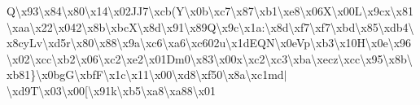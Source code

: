 Q\textbackslash{}x93\textbackslash{}x84\textbackslash{}x80\textbackslash{}x14\textbackslash{}x02\+J\+J7\textbackslash{}xcb(\+Y\textbackslash{}x0b\textquotesingle{}\textbackslash{}xc7\textbackslash{}x87\textbackslash{}xb1\textbackslash{}xe8\textbackslash{}x06\+X\textbackslash{}x00\+L\textbackslash{}x9cx\textbackslash{}x81\textbackslash{}xaa\textbackslash{}x22\textbackslash{}x042\textbackslash{}x8b\textbackslash{}xbc\+X\textbackslash{}x8d\textbackslash{}x91\textbackslash{}x89\+Q\textbackslash{}x9c\textbackslash{}x1a\+:\textbackslash{}x8d\textbackslash{}xf7\textbackslash{}xf7\textbackslash{}xbd\textbackslash{}x85\textbackslash{}xdb4\textbackslash{}x8cy\+Lv\textbackslash{}xd5r\textbackslash{}x80\textbackslash{}x88\textbackslash{}x9a\textbackslash{}xc6\textbackslash{}xa6\textbackslash{}xc602u\textbackslash{}x1d\+E\+Q\+N\textbackslash{}x0e\+Vp\textbackslash{}xb3\textbackslash{}x10\+H\textbackslash{}x0e\textbackslash{}x96\textbackslash{}x02\textbackslash{}xcc\textbackslash{}xb2\textbackslash{}x06\textbackslash{}xc2\textbackslash{}xe2\textbackslash{}x01\+Dm0\textbackslash{}x83\textbackslash{}x00x\textbackslash{}xc2\textbackslash{}xc3\textbackslash{}xba\textbackslash{}xecz\textbackslash{}xcc\textbackslash{}x95\textbackslash{}x8b\textbackslash{}xb81\}\textbackslash{}x0bg\+G\textbackslash{}xbf\+F\textbackslash{}x1c\textbackslash{}x11\textbackslash{}x00\textbackslash{}xd8\textbackslash{}xf50\textbackslash{}x8a\textbackslash{}xc1md$\vert$\textbackslash{}xd9\+T\textbackslash{}x03\textbackslash{}x00\mbox{[}\textbackslash{}x91k\textbackslash{}xb5\textbackslash{}xa8\textbackslash{}xa88\textbackslash{}x01 